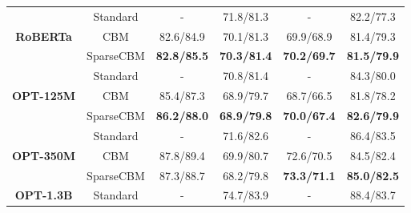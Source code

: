 \documentclass[letterpaper]{article} %
\begin{document}
\begin{table}[t]
\begin{tabular}{cccccc}
\multirow{3}{*}{\textbf{RoBERTa}}    & Standard                            & -                               & 71.8/81.3                     & -                               &   82.2/77.3                              \\
                                     & CBM                                 & 82.6/84.9                     & 70.1/81.3                     &       69.9/68.9                          &     81.4/79.3                            \\
                                     & SparseCBM                           & \textbf{82.8/85.5}            & \textbf{70.3/81.4}            &    \textbf{70.2/69.7}                             &    \textbf{81.5/79.9}                             \\ \midrule
\multirow{3}{*}{\textbf{OPT-125M}}   & Standard                            & -                               & 70.8/81.4                     & -                               &    84.3/80.0                             \\
                                     & CBM                                 & 85.4/87.3                     & 68.9/79.7                     &   68.7/66.5                              &      81.8/78.2                           \\
                                     & SparseCBM                           & \textbf{86.2/88.0}            & \textbf{68.9/79.8}            &    \textbf{70.0/67.4}                             &     \textbf{82.6/79.9}                            \\ \midrule
\multirow{3}{*}{\textbf{OPT-350M}}   & Standard                            & -                               & 71.6/82.6                     & -                               &        86.4/83.5                         \\
                                     & CBM                                 & 87.8/89.4                     & 69.9/80.7                     &   72.6/70.5                              &      84.5/82.4                           \\
                                     & SparseCBM                           & {87.3/88.7}            & {68.2/79.8}            &     \textbf{73.3/71.1}                            &     \textbf{85.0/82.5}                            \\ \midrule
\multirow{3}{*}{\textbf{OPT-1.3B}}   & Standard                            & -                               & 74.7/83.9                     & -                               &       88.4/83.7                          \\

\end{tabular}
\end{table}
\end{document}
